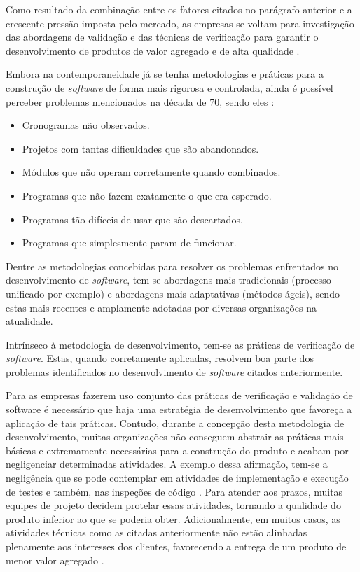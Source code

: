 Como resultado da combinação entre os fatores citados no parágrafo anterior e a crescente pressão imposta pelo mercado, as empresas se voltam para investigação das abordagens de validação e das técnicas de verificação para garantir o desenvolvimento de produtos de valor agregado e de alta qualidade \cite{vbse1}.

Embora na contemporaneidade já se tenha metodologias e práticas para a construção de \textit{software} de forma mais rigorosa e controlada, ainda é possível perceber problemas mencionados na década de 70, sendo eles \cite{qualidadesoftware}:

\begin{itemize}
	\item Cronogramas não observados.
	\item Projetos com tantas dificuldades que são abandonados.
	\item Módulos que não operam corretamente quando combinados.
	\item Programas que não fazem exatamente o que era esperado.
	\item Programas tão difíceis de usar que são descartados.
	\item Programas que simplesmente param de funcionar.
\end{itemize}

Dentre as metodologias concebidas para resolver os problemas enfrentados no desenvolvimento de \textit{software}, tem-se abordagens mais tradicionais (processo unificado por exemplo) e abordagens mais adaptativas (métodos ágeis), sendo estas mais recentes e amplamente adotadas por diversas organizações na atualidade.

Intrínseco à metodologia de desenvolvimento, tem-se as práticas de verificação de \textit{software}. Estas, quando corretamente aplicadas, resolvem boa parte dos problemas identificados no desenvolvimento de \textit{software} citados anteriormente.

Para as empresas fazerem uso conjunto das práticas de verificação e validação de software é necessário que haja uma estratégia de desenvolvimento que favoreça a aplicação de tais práticas. Contudo, durante a concepção desta metodologia de desenvolvimento, muitas organizações não conseguem abstrair as práticas mais básicas e extremamente necessárias para a construção do produto e acabam por negligenciar determinadas atividades. A exemplo dessa afirmação, tem-se a negligência que se pode contemplar em atividades de implementação e execução de testes e também, nas inspeções de código \cite{cemkaner}. Para atender aos prazos, muitas equipes de projeto decidem protelar essas atividades, tornando a qualidade do produto inferior ao que se poderia obter. Adicionalmente, em muitos casos, as atividades técnicas como as citadas anteriormente não estão alinhadas plenamente aos interesses dos clientes, favorecendo a entrega de um produto de menor valor agregado \cite{vbse2}.

